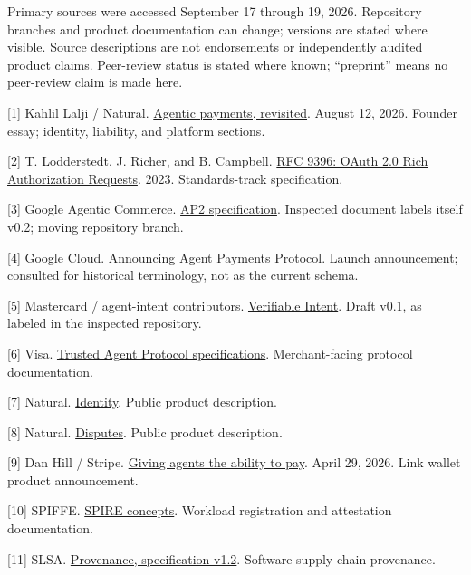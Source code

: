 \documentclass[
  11pt,
  letterpaper,
]{article}
\begin{document}
Primary sources were accessed September 17 through 19, 2026. Repository
branches and product documentation can change; versions are stated where
visible. Source descriptions are not endorsements or independently
audited product claims. Peer-review status is stated where known;
``preprint'' means no peer-review claim is made here.

{[}1{]} Kahlil Lalji / Natural.
\href{https://www.natural.com/blog/agentic-payments-revisited}{Agentic
payments, revisited}. August 12, 2026. Founder essay; identity,
liability, and platform sections.

{[}2{]} T. Lodderstedt, J. Richer, and B. Campbell.
\href{https://www.rfc-editor.org/rfc/rfc9396}{RFC 9396: OAuth 2.0 Rich
Authorization Requests}. 2023. Standards-track specification.

{[}3{]} Google Agentic Commerce.
\href{https://github.com/google-agentic-commerce/AP2/blob/main/docs/ap2/specification.md}{AP2
specification}. Inspected document labels itself v0.2; moving repository
branch.

{[}4{]} Google Cloud.
\href{https://cloud.google.com/blog/products/ai-machine-learning/announcing-agents-to-payments-ap2-protocol}{Announcing
Agent Payments Protocol}. Launch announcement; consulted for historical
terminology, not as the current schema.

{[}5{]} Mastercard / agent-intent contributors.
\href{https://github.com/agent-intent/verifiable-intent/}{Verifiable
Intent}. Draft v0.1, as labeled in the inspected repository.

{[}6{]} Visa.
\href{https://developer.visa.com/capabilities/trusted-agent-protocol/trusted-agent-protocol-specifications}{Trusted
Agent Protocol specifications}. Merchant-facing protocol documentation.

{[}7{]} Natural. \href{https://www.natural.com/identity}{Identity}.
Public product description.

{[}8{]} Natural. \href{https://www.natural.com/disputes}{Disputes}.
Public product description.

{[}9{]} Dan Hill / Stripe.
\href{https://stripe.com/blog/giving-agents-the-ability-to-pay}{Giving
agents the ability to pay}. April 29, 2026. Link wallet product
announcement.

{[}10{]} SPIFFE.
\href{https://spiffe.io/docs/latest/spire-about/spire-concepts/}{SPIRE
concepts}. Workload registration and attestation documentation.

{[}11{]} SLSA. \href{https://slsa.dev/spec/v1.2/provenance}{Provenance,
specification v1.2}. Software supply-chain provenance.
\end{document}
